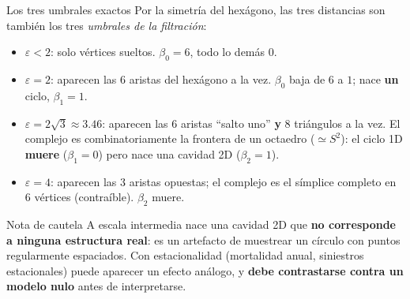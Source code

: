 \documentclass[aspectratio=169,11pt]{beamer}
\begin{document}
\begin{frame}{Los tres umbrales exactos}
  \small
  Por la simetría del hexágono, las tres distancias son también los tres
  \emph{umbrales de la filtración}:
  \begin{itemize}
    \setlength{\itemsep}{0.15em}
    \item $\varepsilon<2$: solo vértices sueltos. $\beta_0=6$, todo lo
      demás $0$.
    \item $\varepsilon=2$: aparecen las $6$ aristas del hexágono a la vez.
      $\beta_0$ baja de $6$ a $1$; nace \textbf{un} ciclo, $\beta_1=1$.
    \item $\varepsilon=2\sqrt{3}\approx3.46$: aparecen las $6$ aristas
      ``salto uno'' \textbf{y} $8$ triángulos a la vez. El complejo es
      combinatoriamente la frontera de un octaedro ($\simeq S^2$): el
      ciclo 1D \textbf{muere} ($\beta_1=0$) pero nace una cavidad 2D
      ($\beta_2=1$).
    \item $\varepsilon=4$: aparecen las $3$ aristas opuestas; el complejo es
      el símplice completo en $6$ vértices (contraíble). $\beta_2$ muere.
  \end{itemize}
  \vspace{0.3em}
  \begin{block}{Nota de cautela}
    A escala intermedia nace una cavidad 2D que \textbf{no corresponde a
      ninguna estructura real}: es un artefacto de muestrear un círculo
    con puntos regularmente espaciados. Con estacionalidad (mortalidad
    anual, siniestros estacionales) puede aparecer un efecto análogo, y
    \textbf{debe contrastarse contra un modelo nulo} antes de interpretarse.
  \end{block}
\end{frame}
\end{document}
